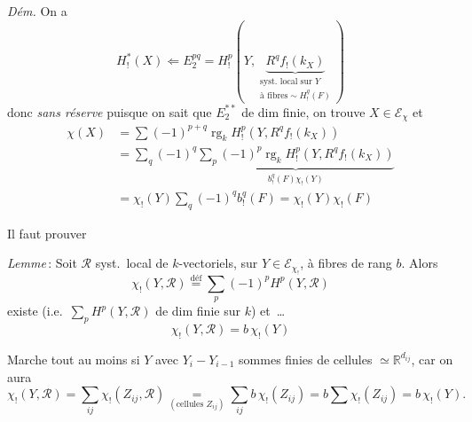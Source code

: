 \documentclass[11pt,a4paper]{article}
\begin{document}
\emph{Dém.} On a
\[
  H^*_!(X) \Longleftarrow E_2^{pq} = H^p_!(Y, \underbrace{R^q f_!(k_X)}_{\substack{\text{syst.\ local sur } Y \\ \text{à fibres} \sim H^q_!(F)}})
\]
donc \emph{sans réserve} puisque on sait que $E_2^{**}$ de dim finie, on trouve $X \in \mathcal{E}_{\chi}$ et
\[
\begin{aligned}
  \chi(X) &= \sum (-1)^{p+q} \operatorname{rg}_k H^p_!(Y, R^q f_!(k_X)) \\
  &= \sum_q (-1)^q \underbrace{\sum_p (-1)^p \operatorname{rg}_k H^p_!(Y, R^q f_!(k_X))}_{b^q_!(F)\chi_!(Y)} \\
  &= \chi_!(Y) \sum_q (-1)^q b^q_!(F) = \chi_!(Y)\chi_!(F)
\end{aligned}
\]

Il faut prouver

\emph{Lemme}\,: Soit $\mathcal{R}$ syst.\ local de $k$-vectoriels, sur  $Y \in \mathcal{E}_{\chi_!}$, à fibres de rang  $b$. Alors
\[
  \chi_!(Y, \mathcal{R}) \overset{\mathrm{déf}}{=} \sum_p (-1)^p H^p(Y, \mathcal{R})
\]
existe (i.e.\ $\sum_p H^p(Y, \mathcal{R})$ de dim finie sur $k$) et~…
\[
  \chi_!(Y, \mathcal{R}) = b\,\chi_!(Y)
\]

Marche tout au moins si $Y$   avec $Y_i - Y_{i-1}$ sommes finies de cellules  $\simeq \mathbb{R}^{d_{ij}}$, car on aura
\[
  \chi_!(Y, \mathcal{R}) = \sum_{ij} \chi_!(Z_{ij}, \mathcal{R}) \underset{(\text{cellules } Z_{ij})}{=} \sum_{ij} b\,\chi_!(Z_{ij}) = b \sum \chi_!(Z_{ij}) = b\,\chi_!(Y) .
\]
\end{document}
